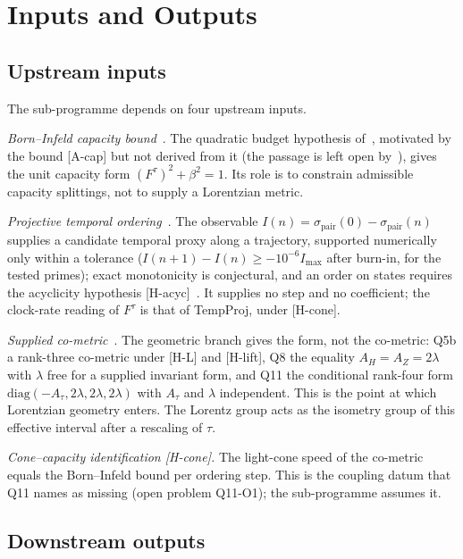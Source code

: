\documentclass[12pt,a4paper]{article}
\theoremstyle{remark}
\begin{document}
  \section{Inputs and Outputs}
  \label{sec:deps}

  \subsection{Upstream inputs}

    The sub-programme depends on four upstream inputs.

    \textit{Born--Infeld capacity bound}~\cite{Beau2026c}.
    The quadratic budget hypothesis of~\cite{Beau2026n}, motivated by the bound [A-cap] but not derived from it (the
    passage is left open by~\cite{Beau2026c}), gives the unit capacity form $(F^\tau)^2 + \beta^2 = 1$.
    Its role is to constrain admissible capacity splittings, not to supply a Lorentzian metric.

    \textit{Projective temporal ordering}~\cite{Beau2026pto}.
    The observable $I(n) = \sigma_{\mathrm{pair}}(0) - \sigma_{\mathrm{pair}}(n)$ supplies a candidate
    temporal proxy along a trajectory, supported numerically only within a tolerance
    ($I(n+1)-I(n) \geq -10^{-6} I_{\max}$ after burn-in, for the tested primes); exact monotonicity is
    conjectural, and an order on states requires the acyclicity hypothesis [H-acyc]~\cite{Beau2026m}.
    It supplies no step and no coefficient; the clock-rate reading of $F^\tau$ is that of TempProj, under [H-cone].

    \textit{Supplied co-metric}~\cite{Beau2026q5b,BeauQ8,Beau2026q11}.
    The geometric branch gives the form, not the co-metric: Q5b a rank-three co-metric under [H-L] and [H-lift],
    Q8 the equality $A_H = A_Z = 2\lambda$ with $\lambda$ free for a supplied invariant form, and Q11 the conditional
    rank-four form $\mathrm{diag}(-A_\tau, 2\lambda, 2\lambda, 2\lambda)$ with $A_\tau$ and $\lambda$ independent.
    This is the point at which Lorentzian geometry enters.
    The Lorentz group acts as the isometry group of this effective interval after a rescaling of $\tau$.

    \textit{Cone--capacity identification [H-cone].}
    The light-cone speed of the co-metric equals the Born--Infeld bound per ordering step.
    This is the coupling datum that Q11 names as missing (open problem Q11-O1); the sub-programme assumes it.

  \subsection{Downstream outputs}
\end{document}
